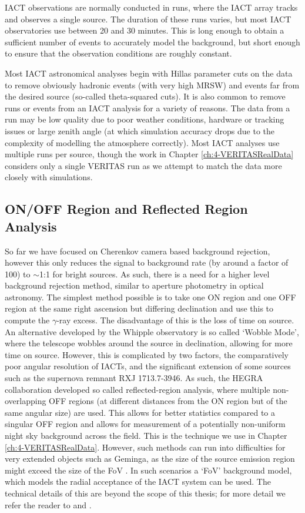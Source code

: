 IACT observations are normally conducted in runs, where the IACT array tracks and observes a single source. The duration of these runs varies, but most IACT observatories use between 20 and 30 minutes. This is long enough to obtain a sufficient number of events to accurately model the background, but short enough to ensure that the observation conditions are roughly constant.

Most IACT astronomical analyses begin with Hillas parameter cuts on the data to remove obviously hadronic events (with very high MRSW) and events far from the desired source (so-called theta-squared cuts). It is also common to remove runs or events from an IACT analysis for a variety of reasons. The data from a run may be low quality due to poor weather conditions, hardware or tracking issues or large zenith angle (at which simulation accuracy drops due to the complexity of modelling the atmosphere correctly). Most IACT analyses use multiple runs per source, though the work in Chapter \ref{ch:4-VERITASRealData} considers only a single VERITAS run as we attempt to match the data more closely with simulations.

\subsection{ON/OFF Region and Reflected Region Analysis}
So far we have focused on Cherenkov camera based background rejection, however this only reduces the signal to background rate (by around a factor of 100) to $\sim$1:1 for bright sources. As such, there is a need for a higher level background rejection method, similar to aperture photometry in optical astronomy. The simplest method possible is to take one ON region and one OFF region at the same right ascension but differing declination and use this to compute the $\gamma$-ray excess. The disadvantage of this is the loss of time on source. An alternative developed by the Whipple observatory is so called `Wobble Mode', where the telescope wobbles around the source in declination, allowing for more time on source. However, this is complicated by two factors, the comparatively poor angular resolution of IACTs, and the significant extension of some sources such as the supernova remnant RXJ 1713.7-3946. As such, the HEGRA collaboration \cite{HEGRA} developed so called reflected-region analysis, where multiple non-overlapping OFF regions (at different distances from the ON region but of the same angular size) are used. This allows for better statistics compared to a singular OFF region and allows for measurement of a potentially non-uniform night sky background across the field. This is the technique we use in Chapter \ref{ch:4-VERITASRealData}. However, such methods can run into difficulties for very extended objects such as Geminga, as the size of the source emission region might exceed the size of the FoV \cite{geminga}. In such scenarios a `FoV' background model, which models the radial acceptance of the IACT system can be used. The technical details of this are beyond the scope of this thesis; for more detail we refer the reader to \cite{Berge07} and \cite{geminga}. 

